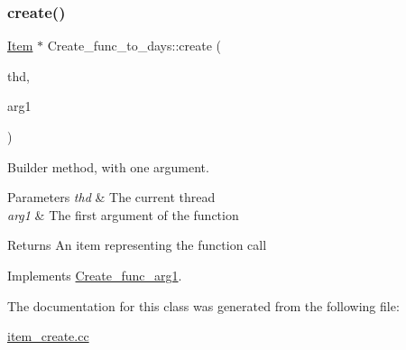 \subsubsection{\texorpdfstring{create()}{create()}}
{\footnotesize\ttfamily \mbox{\hyperlink{classItem}{Item}} $\ast$ Create\+\_\+func\+\_\+to\+\_\+days\+::create (\begin{DoxyParamCaption}\item[{T\+HD $\ast$}]{thd,  }\item[{\mbox{\hyperlink{classItem}{Item}} $\ast$}]{arg1 }\end{DoxyParamCaption})\hspace{0.3cm}{\ttfamily [virtual]}}

Builder method, with one argument. 
\begin{DoxyParams}{Parameters}
{\em thd} & The current thread \\
\hline
{\em arg1} & The first argument of the function \\
\hline
\end{DoxyParams}
\begin{DoxyReturn}{Returns}
An item representing the function call 
\end{DoxyReturn}


Implements \mbox{\hyperlink{classCreate__func__arg1_a3e9a98f755cd82c3e762e334c955a8c9}{Create\+\_\+func\+\_\+arg1}}.



The documentation for this class was generated from the following file\+:\begin{DoxyCompactItemize}
\item 
\mbox{\hyperlink{item__create_8cc}{item\+\_\+create.\+cc}}\end{DoxyCompactItemize}
